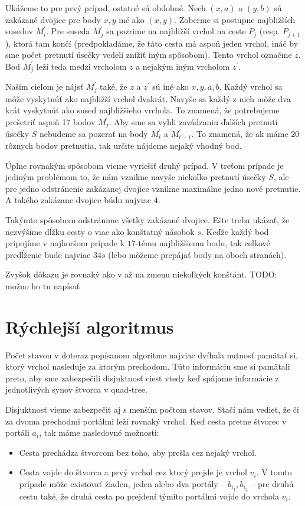 \begin{dokaz}
Ukážeme to pre prvý prípad, ostatné sú obdobné. 
Nech $(x, a)$ a $(y, b)$ sú zakázané dvojice pre body $x, y$ iné ako $(x,y)$. 
Zoberme si postupne najbližších susedov $M_i^{'}$. Pre suseda $M^{'}_j$ sa pozrime na najbližší vrchol na
ceste $P_j$ (resp. $P_{j+1}$), ktorá tam končí (predpokladáme, že táto cesta má aspoň jeden vrchol, ináč by sme počet
pretnutí úsečky vedeli znížiť iným spôsobom). Tento vrchol označme $z$. Bod $M^{'}_j$ leží teda
medzi vrcholom $z$ a nejakým iným vrcholom $z^{'}$.  

Našim cieľom je nájsť $M_j^{'}$ také, že $z$ a $z^{'}$ sú iné ako $x, y, a, b$. Každý vrchol sa môže
vyskytnúť ako najbližší vrchol dvakrát. Navyše sa každý z nich môže dva krát vyskytnúť ako sused
najbližšieho vrchola. To znamená, že potrebujeme prešetriť aspoň 17 bodov $M_j^{'}$.
Aby sme sa vyhli zavádzaniu ďalších pretnutí úsečky $S$ nebudeme sa pozerať na body $M_t^{'}$ a
$M_{t-1}^{'}$. To znamená, že ak máme $20$ rôznych bodov pretnutia, tak určite nájdeme nejaký vhodný bod.

Úplne rovnakým spôsobom vieme vyriešiť druhý prípad. V treťom prípade je jediným problémom to, že
nám vznikne navyše niekoľko pretnutí úsečky $S$, ale pre jedno odstránenie zakázanej dvojice vznikne
maximálne jedno nové pretnutie. A takého zakázane dvojice búdu najviac $4$. 

Takýmto spôsobom odstránime všetky zakázané dvojice. Ešte treba ukázať, že nezvýšime dĺžku cesty
o viac ako konštatný násobok $s$. Keďže každý bod pripojíme v najhoršom prípade k $17$-tému
najbližšiemu bodu, tak celkové predĺženie bude najviac $34s$ (lebo môžeme prepájať body na oboch
stranách). 
\end{dokaz}

Zvyšok dôkazu je rovnaký ako v \cite{Arora} až na zmenu niekoľkých konštánt.
TODO: možno ho tu napísať

\section{Rýchlejší algoritmus}

Počet stavou v doteraz popísanom algoritme najviac dvíhala nutnosť pamätať si, ktorý vrchol
nasleduje za ktorým prechodom. Túto informáciu sme si pamätali preto, aby sme zabezpečili
disjuktnosť ciest vtedy keď spájame informácie z jednotlivých synov štvorca v quad-tree.

Disjuktnosť vieme zabezpečiť aj s menším počtom stavov.
Stačí nám vedieť, že či za dvoma prechodmi portálmi leží rovnaký vrchol.
Keď cesta pretne štvorec v portáli $a_i$, tak máme nasledovné možnosti:
\begin{itemize}
\item Cesta prechádza štvorcom bez toho, aby prešla cez nejaký vrchol.
\item Cesta vojde do štvorca a prvý vrchol cez ktorý prejde je vrchol $v_i$.
V tomto prípade môže existovať žiaden, jeden alebo dva portály -- $b_{i_1}, b_{i_2}$ --
pre druhú cestu také, že druhá cesta po prejdení týmito portálmi vojde
do vrchola $v_i$.
\end{itemize}

